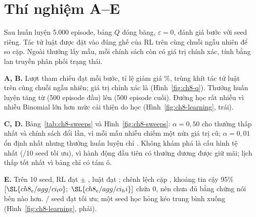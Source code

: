 
\section{Thí nghiệm A--E}

Sau huấn luyện 5.000 episode, bảng $Q$ đóng băng, $\varepsilon=0$, đánh giá  bước với seed riêng. Tác tử luật được đặt vào đúng ghế của RL trên cùng chuỗi ngẫu
nhiên để so cặp. Ngoài thưởng lấy mẫu, mỗi chính sách còn có giá trị chính xác, tính bằng lan truyền phân phối trạng thái.

\textbf{A, B.} Lượt tham chiếu đạt  mỗi bước, tỉ lệ giảm giá \%, trùng khít tác tử luật trên cùng chuỗi ngẫu nhiên; giá trị chính xác là 
(Hình~\ref{fig:ch8-q}). Thưởng huấn luyện tăng từ  (500 episode đầu) lên  (500 episode cuối). Đường học rất nhiễu vì nhiễu Binomial lớn hơn mức cải thiện do học
(Hình~\ref{fig:ch8-learning}, trái).


\textbf{C, D.} Bảng~\ref{tab:ch8-sweeps} và Hình~\ref{fig:ch8-sweeps}: $\alpha=0{,}50$ cho thưởng thấp nhất và chính sách đổi  lần, vì mỗi mẫu nhiễu chiếm một nửa
giá trị cũ; $\alpha=0{,}01$ ổn định nhất nhưng thưởng huấn luyện chỉ . Không khám phá là cấu hình tệ nhất (/10 seed tối ưu), vì hành động đầu tiên có thưởng dương
được giữ mãi; lịch thấp tốt nhất vì bảng chỉ có tám ô.


\textbf{E.} Trên 10 seed, RL đạt  $\pm$ , luật đạt ; chênh lệch cặp , khoảng tin cậy 95\%
$[\SL{ch8_e/agg/ci_lo};\ \SL{ch8_e/agg/ci_hi}]$ chứa 0, nên chưa đủ bằng chứng nói bên nào hơn. / seed đạt tối ưu; một seed học hỏng kéo trung bình xuống
(Hình~\ref{fig:ch8-learning}, phải).

